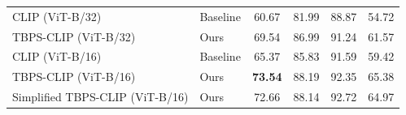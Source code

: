 \documentclass[letterpaper]{article} %
\begin{document}
\begin{table}[t]
\begin{center}
{\begin{tabular}{l!{\vrule}l!{\vrule}cccc}
\midrule
CLIP (ViT-B/32) &Baseline& 60.67 & 81.99 & 88.87 & 54.72 \\
TBPS-CLIP (ViT-B/32) &Ours& 69.54 & 86.99 & 91.24 & 61.57 \\
CLIP (ViT-B/16) &Baseline& 65.37 & 85.83 & 91.59 & 59.42 \\
  TBPS-CLIP (ViT-B/16) &Ours&   \textbf{73.54} & 88.19 & 92.35 & 65.38 \\
\hdashline
Simplified TBPS-CLIP (ViT-B/16) &Ours& 72.66 & 88.14 & 92.72 & 64.97 \\
\bottomrule
\end{tabular}
}
\end{center}
\vspace{-0.1cm}
\end{table}

\end{document}
